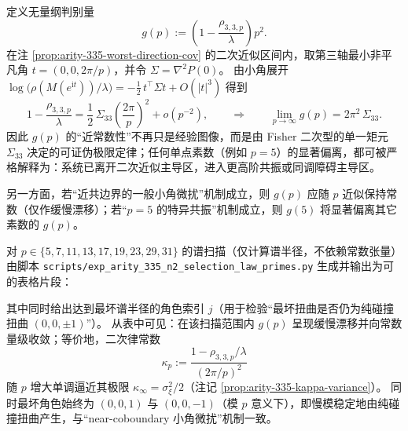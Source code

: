 \begin{remark}\label{rem:arity-335-selection-law-gp}
定义无量纲判别量
\[
g(p):=\left(1-\frac{\rho_{3,3,p}}{\lambda}\right)p^2.
\]
在注 \ref{prop:arity-335-worst-direction-cov} 的二次近似区间内，取第三轴最小非平凡角
\(
t=(0,0,2\pi/p)
\)，并令 \(\Sigma=\nabla^2P(0)\)。
由小角展开
\(
\log\bigl(\rho(M(e^{\mathrm{i}t}))/\lambda\bigr)=-\tfrac12\,t^\top\Sigma t+O(|t|^3)
\)
得到
\[
1-\frac{\rho_{3,3,p}}{\lambda}
=\frac12\,\Sigma_{33}\left(\frac{2\pi}{p}\right)^2+o(p^{-2}),
\qquad\Longrightarrow\qquad
\lim_{p\to\infty}g(p)=2\pi^2\,\Sigma_{33}.
\]
因此 \(g(p)\) 的“近常数性”不再只是经验图像，而是由 Fisher 二次型的单一矩元 \(\Sigma_{33}\) 决定的可证伪极限定律；任何单点素数（例如 \(p=5\)）的显著偏离，都可被严格解释为：系统已离开二次近似主导区，进入更高阶共振或同调障碍主导区。
\par
另一方面，若“近共边界的一般小角微扰”机制成立，则 \(g(p)\) 应随 \(p\) 近似保持常数（仅作缓慢漂移）；若“\(p=5\) 的特异共振”机制成立，则 \(g(5)\) 将显著偏离其它素数的 \(g(p)\)。
\par
对 \(p\in\{5,7,11,13,17,19,23,29,31\}\) 的谱扫描（仅计算谱半径，不依赖常数张量）由脚本
\texttt{scripts/exp\_arity\_335\_n2\_selection\_law\_primes.py}
生成并输出为可 \verb|| 的表格片段：

其中同时给出达到最坏谱半径的角色索引 \(j\)（用于检验“最坏扭曲是否仍为纯碰撞扭曲 \((0,0,\pm1)\)”）。
从表中可见：在该扫描范围内 \(g(p)\) 呈现缓慢漂移并向常数量级收敛；等价地，二次律常数
\[
\kappa_p:=\frac{1-\rho_{3,3,p}/\lambda}{(2\pi/p)^2}
\]
随 \(p\) 增大单调逼近其极限 \(\kappa_\infty=\sigma_\xi^2/2\)（注记 \ref{prop:arity-335-kappa-variance}）。
同时最坏角色始终为 \((0,0,1)\) 与 \((0,0,-1)\)（模 \(p\) 意义下），即慢模稳定地由纯碰撞扭曲产生，与“near-coboundary 小角微扰”机制一致。
\end{remark}
